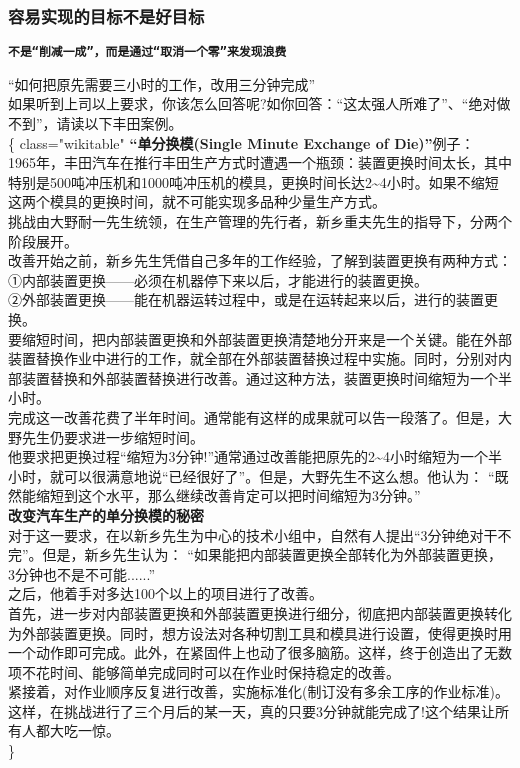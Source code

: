 \documentclass[]{article}
\begin{document}
\hypertarget{ux5bb9ux6613ux5b9eux73b0ux7684ux76eeux6807ux4e0dux662fux597dux76eeux6807}{%
\subsubsection{容易实现的目标不是好目标}\label{ux5bb9ux6613ux5b9eux73b0ux7684ux76eeux6807ux4e0dux662fux597dux76eeux6807}}

\textbf{\texttt{不是“削减一成”，而是通过“取消一个零”来发现浪费}}

``如何把原先需要三小时的工作，改用三分钟完成''\\
如果听到上司以上要求，你该怎么回答呢?如你回答：``这太强人所难了''、``绝对做不到''，请读以下丰田案例。\\
\{\textbar{} class="wikitable" \textbar{}\textbf{``单分换模(Single
Minute Exchange of Die)''}例子：\\
1965年，丰田汽车在推行丰田生产方式时遭遇一个瓶颈：装置更换时间太长，其中特别是500吨冲压机和1000吨冲压机的模具，更换时间长达2\textasciitilde{}4小时。如果不缩短这两个模具的更换时间，就不可能实现多品种少量生产方式。\\
挑战由大野耐一先生统领，在生产管理的先行者，新乡重夫先生的指导下，分两个阶段展开。\\
改善开始之前，新乡先生凭借自己多年的工作经验，了解到装置更换有两种方式：\\
①内部装置更换------必须在机器停下来以后，才能进行的装置更换。\\
②外部装置更换------能在机器运转过程中，或是在运转起来以后，进行的装置更换。\\
要缩短时间，把内部装置更换和外部装置更换清楚地分开来是一个关键。能在外部装置替换作业中进行的工作，就全部在外部装置替换过程中实施。同时，分别对内部装置替换和外部装置替换进行改善。通过这种方法，装置更换时间缩短为一个半小时。\\
完成这一改善花费了半年时间。通常能有这样的成果就可以告一段落了。但是，大野先生仍要求进一步缩短时间。\\
他要求把更换过程``缩短为3分钟!''通常通过改善能把原先的2\textasciitilde{}4小时缩短为一个半小时，就可以很满意地说``已经很好了''。但是，大野先生不这么想。他认为：
``既然能缩短到这个水平，那么继续改善肯定可以把时间缩短为3分钟。''\\
\textbf{改变汽车生产的单分换模的秘密}\\
对于这一要求，在以新乡先生为中心的技术小组中，自然有人提出``3分钟绝对干不完''。但是，新乡先生认为：
``如果能把内部装置更换全部转化为外部装置更换，
3分钟也不是不可能......''\\
之后，他着手对多达100个以上的项目进行了改善。\\
首先，进一步对内部装置更换和外部装置更换进行细分，彻底把内部装置更换转化为外部装置更换。同时，想方设法对各种切割工具和模具进行设置，使得更换时用一个动作即可完成。此外，在紧固件上也动了很多脑筋。这样，终于创造出了无数项不花时间、能够简单完成同时可以在作业时保持稳定的改善。\\
紧接着，对作业顺序反复进行改善，实施标准化(制订没有多余工序的作业标准)。这样，在挑战进行了三个月后的某一天，真的只要3分钟就能完成了!这个结果让所有人都大吃一惊。\\
\textbar{}\}
\end{document}
